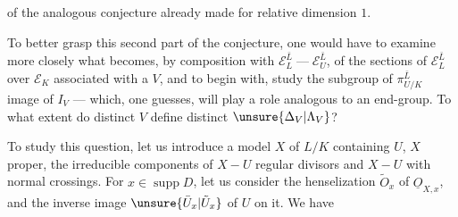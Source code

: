 of the analogous conjecture already made for relative dimension $1$.

To better grasp this second part  of the conjecture, one would have to examine more closely what becomes, by composition with $\mathcal E_L^{\bar L}\mathrel{\text{---}}\mathcal E_U^{\bar L}$, of the sections of $\mathcal E_L^{\bar L}$ over $\mathcal E_K$ associated with a $V$, and to begin with, study the subgroup  of $\pi_{U/K}^{\bar L}$ image of $I_V$ --- which, one guesses, will play a role analogous to an end-group. To what extent do distinct $V$ define distinct $\unsure{\Delta_V|\Lambda_V}$?

To study this question, let us introduce a model $X$ of $L/K$ containing $U$, $X$ proper, the irreducible components of  $X-U$ regular divisors  and $X-U$ with normal crossings. For $x\in\operatorname{supp}D$, let us consider the  henselization $\tilde O_x$ of $\underline{O}_{X,x}$, and the inverse image $\unsure{\bar U_x|\tilde U_x}$ of $U$ on it. We have
